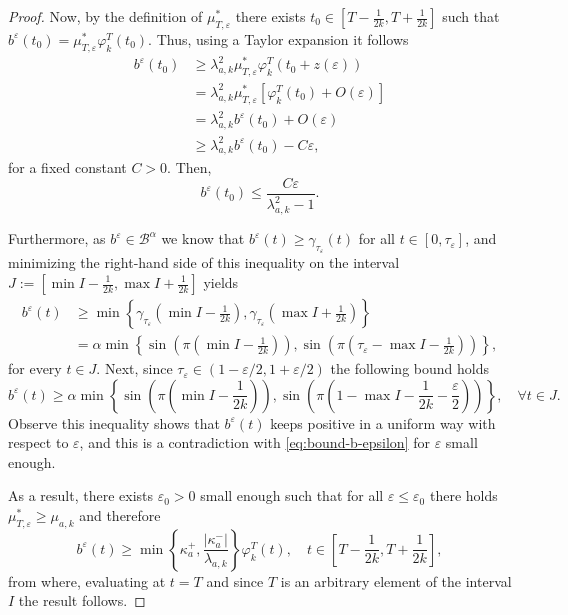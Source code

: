 \documentclass[a4paper,11pt]{article}
\theoremstyle{plain}
\theoremstyle{definition}
\theoremstyle{definition}
\newcommand{\B}{\mathcal{B}}
\numberwithin{equation}{section}
\begin{document}
\begin{proof}
Now, by the definition of $\mu_{T,\varepsilon}^*$ there exists $t_0\in \left[ T- \frac{1}{2k},T+\frac{1}{2k} \right]$ such that $b^\varepsilon(t_0) = \mu_{T,\varepsilon}^* \varphi_k^T(t_0)$. Thus, using a Taylor expansion it follows
\begin{align*}
    b^\varepsilon(t_0) & \geq \lambda_{a,k}^2 \mu_{T,\varepsilon}^* \varphi_k^T (t_0 + z(\varepsilon)) \\
    & = \lambda_{a,k}^2 \mu_{T,\varepsilon}^* [ \varphi_k^T(t_0) + O(\varepsilon) ] \\
    & = \lambda_{a,k}^2 b^\varepsilon(t_0) + O(\varepsilon) \\
    &\geq \lambda_{a,k}^2 b^\varepsilon (t_0) - C\varepsilon,
\end{align*}
for a fixed constant $C>0$. Then,
\begin{equation}\label{eq:bound-b-epsilon}
    b^\varepsilon (t_0) \leq \frac{C \varepsilon}{\lambda_{a,k}^2 - 1}.
\end{equation}

Furthermore, as $b^\varepsilon\in \B^\alpha$ we know that $b^\varepsilon(t)\geq \gamma_{\tau_\varepsilon}(t)$ for all $t\in[0,\tau_\varepsilon]$, and minimizing the right-hand side of this inequality on the interval $J:=\left[ \min I - \frac{1}{2k}, \max I + \frac{1}{2k} \right]$ yields
\begin{align*}
    b^\varepsilon(t) &\geq \min\left\{ \gamma_{\tau_\varepsilon}\left( \min I - \frac{1}{2k} \right), \gamma_{\tau_\varepsilon}\left( \max I + \frac{1}{2k} \right) \right\} \\
    &= \alpha \min \left\{ \sin\left( \pi\left( \min I - \frac{1}{2k} \right)  \right) , \sin\left( \pi \left( \tau_\varepsilon -\max I -\frac{1}{2k} \right) \right) \right\},
\end{align*}
for every $t\in J$. Next, since $\tau_\varepsilon\in(1-\varepsilon/2,1+\varepsilon/2)$ the following bound holds
\[
    b^\varepsilon(t) \geq \alpha \min\left\{ \sin\left( \pi \left( \min I - \frac{1}{2k} \right) \right), \sin\left( \pi \left( 1 - \max I -\frac{1}{2k} - \frac{\varepsilon}{2} \right) \right) \right\}, \quad \forall t\in J.
\]
Observe this inequality shows that $b^\varepsilon(t)$ keeps positive in a uniform way with respect to $\varepsilon$, and this is a contradiction with \eqref{eq:bound-b-epsilon} for $\varepsilon$ small enough.

As a result, there exists $\varepsilon_0>0$ small enough such that for all $\varepsilon\leq \varepsilon_0$ there holds $\mu_{T,\varepsilon}^* \geq \mu_{a,k}$ and therefore
\[
    b^\varepsilon(t) \geq \min\left\{ \kappa_a^+, \frac{|\kappa_a^-|}{\lambda_{a,k}} \right\} \varphi_k^T(t), \quad t\in \left[T- \frac{1}{2k}, T+\frac{1}{2k} \right],
\]
from where, evaluating at $t=T$ and since $T$ is an arbitrary element of the interval $I$ the result follows.
\end{proof}
\end{document}
